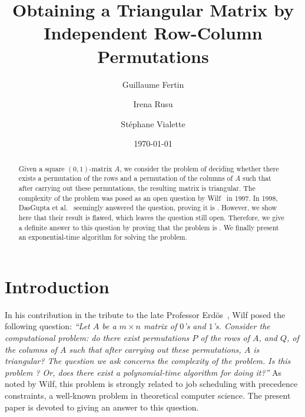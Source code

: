 \documentclass[a4paper,10pt]{llncs}
\begin{document}

\title{%
Obtaining a Triangular Matrix by Independent Row-Column Permutations
}%

\author{%
  Guillaume Fertin \and
  Irena Rusu \and
  St\'ephane Vialette
}%
\date{\today}

\maketitle


\begin{abstract}
Given a square $(0,1)$-matrix $A$,
we consider the problem of deciding whether there exists a permutation
of the rows and a permutation of the columns of 
$A$ such that after carrying out these permutations,
the resulting matrix is triangular. The complexity of the problem was
posed as an open question by Wilf~\cite{Wilf:1997} in 1997.
In 1998, DasGupta et al.~\cite{DasGuptaJiangKannanLiSweedyk:1998} seemingly answered the
question, proving it is \NPC. However, we show here that their result is flawed, which 
leaves the question still open. Therefore, we give a definite answer
to this question by proving that the problem is \NPC. We finally present an
exponential-time algorithm for solving the problem.
\end{abstract}




\section{Introduction}
\label{section:Introduction}

In his contribution in the tribute to the late Professor
Erd\"os~\cite{Wilf:1997}, Wilf posed the following question:
\emph{
  ``Let $A$ be a $m \times n$ matrix of $0$'s and $1$'s. Consider the
  computational problem: do there exist permutations $P$ of the rows
  of $A$, and $Q$, of the columns of $A$ such that after carrying out
  these permutations, $A$ is triangular? The question we ask concerns
  the complexity of the problem.
  Is this problem \NPC?
  Or, does there exist a polynomial-time algorithm for doing it?''}
As noted by Wilf,
this problem is strongly related to job scheduling with precedence
constraints, a well-known problem in theoretical computer science.
The present paper is devoted to giving an answer to this question.
\end{document}
